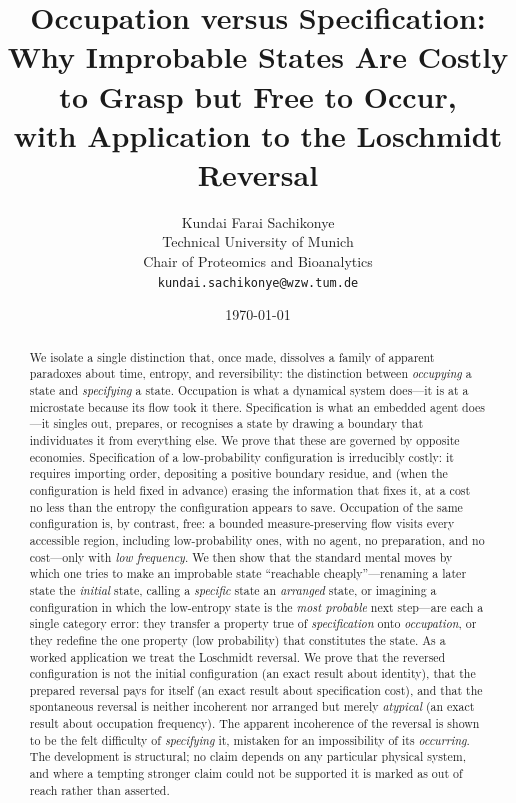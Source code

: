 \documentclass[11pt,a4paper]{article}
\title{\textbf{Occupation versus Specification:\\[2pt]
Why Improbable States Are Costly to Grasp but Free to Occur,\\
with Application to the Loschmidt Reversal}}
\author{%
Kundai Farai Sachikonye\\
\small Technical University of Munich\\
\small Chair of Proteomics and Bioanalytics\\
\small \texttt{kundai.sachikonye@wzw.tum.de}}
\date{\today}
\theoremstyle{thmstyle}
\theoremstyle{definition}
\theoremstyle{remark}
\begin{document}
\maketitle

\begin{abstract}
\noindent
We isolate a single distinction that, once made, dissolves a family of
apparent paradoxes about time, entropy, and reversibility: the distinction
between \emph{occupying} a state and \emph{specifying} a state. Occupation is
what a dynamical system does---it is at a microstate because its flow took it
there. Specification is what an embedded agent does---it singles out, prepares,
or recognises a state by drawing a boundary that individuates it from
everything else. We prove that these are governed by opposite economies.
Specification of a low-probability configuration is irreducibly costly: it
requires importing order, depositing a positive boundary residue, and (when
the configuration is held fixed in advance) erasing the information that fixes
it, at a cost no less than the entropy the configuration appears to save.
Occupation of the same configuration is, by contrast, free: a bounded
measure-preserving flow visits every accessible region, including
low-probability ones, with no agent, no preparation, and no cost---only with
\emph{low frequency}. We then show that the standard mental moves by which one
tries to make an improbable state ``reachable cheaply''---renaming a
later state the \emph{initial} state, calling a \emph{specific} state an
\emph{arranged} state, or imagining a configuration in which the low-entropy
state is the \emph{most probable} next step---are each a single
category error: they transfer a property true of \emph{specification} onto
\emph{occupation}, or they redefine the one property (low probability) that
constitutes the state. As a worked application we treat the Loschmidt
reversal. We prove that the reversed configuration is not the initial
configuration (an exact result about identity), that the prepared reversal
pays for itself (an exact result about specification cost), and that the
spontaneous reversal is neither incoherent nor arranged but merely
\emph{atypical} (an exact result about occupation frequency). The apparent
incoherence of the reversal is shown to be the felt difficulty of
\emph{specifying} it, mistaken for an impossibility of its \emph{occurring}.
The development is structural; no claim depends on any particular physical
system, and where a tempting stronger claim could not be supported it is
marked as out of reach rather than asserted.
\end{abstract}
\end{document}
